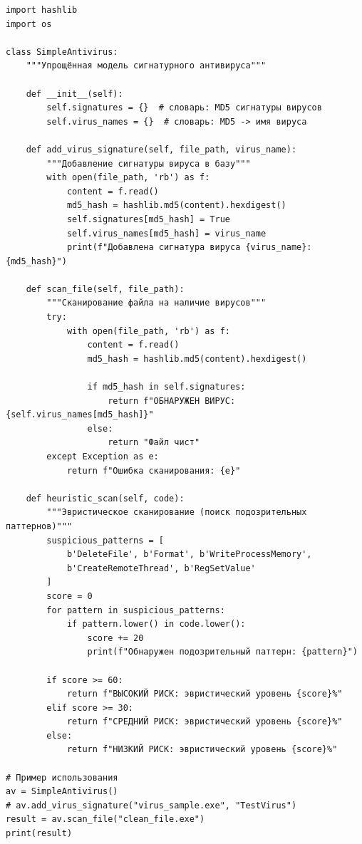 \begin{listing}[h]
\caption{Сигнатурный метод обнаружения вирусов}
\label{code:signature_scanner}
 
\begin{verbatim}
import hashlib
import os
 
class SimpleAntivirus:
    """Упрощённая модель сигнатурного антивируса"""
    
    def __init__(self):
        self.signatures = {}  # словарь: MD5 сигнатуры вирусов
        self.virus_names = {}  # словарь: MD5 -> имя вируса
        
    def add_virus_signature(self, file_path, virus_name):
        """Добавление сигнатуры вируса в базу"""
        with open(file_path, 'rb') as f:
            content = f.read()
            md5_hash = hashlib.md5(content).hexdigest()
            self.signatures[md5_hash] = True
            self.virus_names[md5_hash] = virus_name
            print(f"Добавлена сигнатура вируса {virus_name}: {md5_hash}")
    
    def scan_file(self, file_path):
        """Сканирование файла на наличие вирусов"""
        try:
            with open(file_path, 'rb') as f:
                content = f.read()
                md5_hash = hashlib.md5(content).hexdigest()
                
                if md5_hash in self.signatures:
                    return f"ОБНАРУЖЕН ВИРУС: {self.virus_names[md5_hash]}"
                else:
                    return "Файл чист"
        except Exception as e:
            return f"Ошибка сканирования: {e}"
    
    def heuristic_scan(self, code):
        """Эвристическое сканирование (поиск подозрительных паттернов)"""
        suspicious_patterns = [
            b'DeleteFile', b'Format', b'WriteProcessMemory',
            b'CreateRemoteThread', b'RegSetValue'
        ]
        score = 0
        for pattern in suspicious_patterns:
            if pattern.lower() in code.lower():
                score += 20
                print(f"Обнаружен подозрительный паттерн: {pattern}")
        
        if score >= 60:
            return f"ВЫСОКИЙ РИСК: эвристический уровень {score}%"
        elif score >= 30:
            return f"СРЕДНИЙ РИСК: эвристический уровень {score}%"
        else:
            return f"НИЗКИЙ РИСК: эвристический уровень {score}%"
 
# Пример использования
av = SimpleAntivirus()
# av.add_virus_signature("virus_sample.exe", "TestVirus")
result = av.scan_file("clean_file.exe")
print(result)
\end{verbatim}
\end{listing}
 
